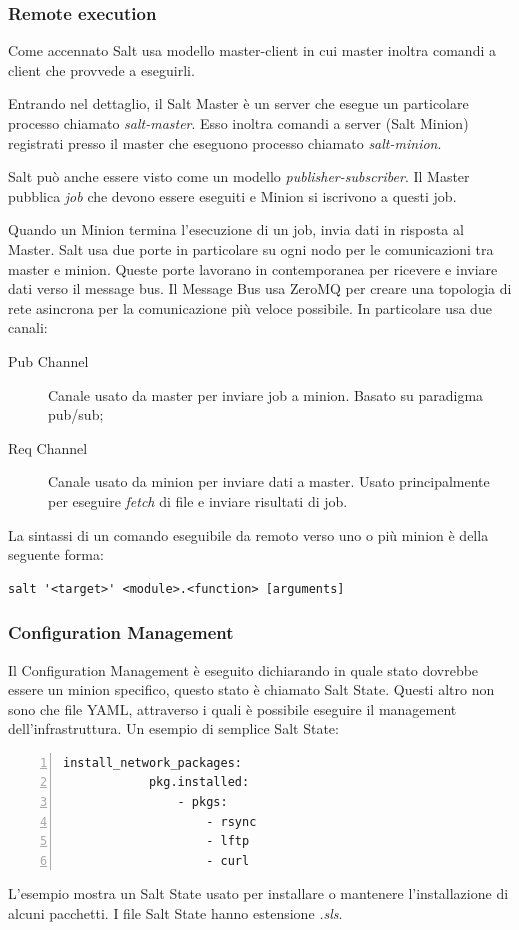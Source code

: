 \subsubsection{Remote execution}
Come accennato Salt usa modello master-client in cui master inoltra comandi a client che provvede a eseguirli.

Entrando nel dettaglio, il Salt Master è un server che esegue un particolare processo chiamato \textit{salt-master}.  Esso inoltra comandi a  server (Salt Minion) registrati presso il master che eseguono processo chiamato \textit{salt-minion}.

Salt può anche essere visto come un modello \textit{publisher-subscriber}. Il Master pubblica \textit{job} che devono essere eseguiti e Minion si iscrivono a questi job.

Quando un Minion termina l'esecuzione di un job, invia dati in risposta al Master. Salt usa due porte in particolare su ogni nodo per le comunicazioni tra master e minion.  Queste porte lavorano in contemporanea per ricevere e inviare dati verso il message bus.
Il Message Bus usa ZeroMQ per creare una topologia di rete asincrona per la comunicazione più veloce possibile.
In particolare usa due canali:
\begin{description}
    \item [Pub Channel] Canale usato da master per inviare job a minion. Basato su paradigma pub/sub;
    \item [Req Channel] Canale usato da minion per inviare dati a master. Usato principalmente per eseguire \textit{fetch} di file e inviare risultati di job.
\end{description}


La sintassi di un comando eseguibile da remoto verso uno  o più minion è della seguente forma:

\begin{center}
\begin{BVerbatim}
salt '<target>' <module>.<function> [arguments]
\end{BVerbatim}
\end{center}
\subsubsection{Configuration Management}
Il Configuration Management è eseguito dichiarando in quale stato dovrebbe essere un minion specifico, questo stato è chiamato Salt State. Questi altro non sono che file YAML, attraverso i quali è possibile eseguire il management dell'infrastruttura.
Un esempio di semplice Salt State:
    \begin{Verbatim}[numbers=left, frame=single, fontsize=\small]
        install_network_packages:
            pkg.installed:
                - pkgs:
                    - rsync
                    - lftp
                    - curl
    \end{Verbatim}
L'esempio  mostra un Salt State usato per installare o mantenere l'installazione di alcuni pacchetti. I file Salt State hanno estensione \textit{.sls}.

